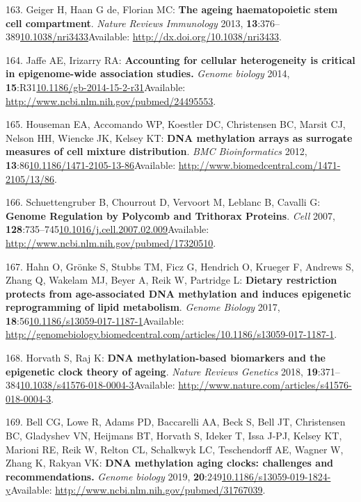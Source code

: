 \documentclass[
]{book}
\begin{document}
\leavevmode\hypertarget{ref-Geiger2013}{}%
163. Geiger H, Haan G de, Florian MC: \textbf{The ageing haematopoietic stem cell compartment}. \emph{Nature Reviews Immunology} 2013, \textbf{13}:376--389\href{https://doi.org/10.1038/nri3433}{10.1038/nri3433}Available: \url{http://dx.doi.org/10.1038/nri3433}.

\leavevmode\hypertarget{ref-Jaffe2014}{}%
164. Jaffe AE, Irizarry RA: \textbf{Accounting for cellular heterogeneity is critical in epigenome-wide association studies.} \emph{Genome biology} 2014, \textbf{15}:R31\href{https://doi.org/10.1186/gb-2014-15-2-r31}{10.1186/gb-2014-15-2-r31}Available: \url{http://www.ncbi.nlm.nih.gov/pubmed/24495553}.

\leavevmode\hypertarget{ref-Houseman2012}{}%
165. Houseman EA, Accomando WP, Koestler DC, Christensen BC, Marsit CJ, Nelson HH, Wiencke JK, Kelsey KT: \textbf{DNA methylation arrays as surrogate measures of cell mixture distribution}. \emph{BMC Bioinformatics} 2012, \textbf{13}:86\href{https://doi.org/10.1186/1471-2105-13-86}{10.1186/1471-2105-13-86}Available: \url{http://www.biomedcentral.com/1471-2105/13/86}.

\leavevmode\hypertarget{ref-Schuettengruber2017}{}%
166. Schuettengruber B, Chourrout D, Vervoort M, Leblanc B, Cavalli G: \textbf{Genome Regulation by Polycomb and Trithorax Proteins}. \emph{Cell} 2007, \textbf{128}:735--745\href{https://doi.org/10.1016/j.cell.2007.02.009}{10.1016/j.cell.2007.02.009}Available: \url{http://www.ncbi.nlm.nih.gov/pubmed/17320510}.

\leavevmode\hypertarget{ref-Hahn2017}{}%
167. Hahn O, Grönke S, Stubbs TM, Ficz G, Hendrich O, Krueger F, Andrews S, Zhang Q, Wakelam MJ, Beyer A, Reik W, Partridge L: \textbf{Dietary restriction protects from age-associated DNA methylation and induces epigenetic reprogramming of lipid metabolism}. \emph{Genome Biology} 2017, \textbf{18}:56\href{https://doi.org/10.1186/s13059-017-1187-1}{10.1186/s13059-017-1187-1}Available: \url{http://genomebiology.biomedcentral.com/articles/10.1186/s13059-017-1187-1}.

\leavevmode\hypertarget{ref-Horvath2018}{}%
168. Horvath S, Raj K: \textbf{DNA methylation-based biomarkers and the epigenetic clock theory of ageing}. \emph{Nature Reviews Genetics} 2018, \textbf{19}:371--384\href{https://doi.org/10.1038/s41576-018-0004-3}{10.1038/s41576-018-0004-3}Available: \url{http://www.nature.com/articles/s41576-018-0004-3}.

\leavevmode\hypertarget{ref-Bell2019}{}%
169. Bell CG, Lowe R, Adams PD, Baccarelli AA, Beck S, Bell JT, Christensen BC, Gladyshev VN, Heijmans BT, Horvath S, Ideker T, Issa J-PJ, Kelsey KT, Marioni RE, Reik W, Relton CL, Schalkwyk LC, Teschendorff AE, Wagner W, Zhang K, Rakyan VK: \textbf{DNA methylation aging clocks: challenges and recommendations.} \emph{Genome biology} 2019, \textbf{20}:249\href{https://doi.org/10.1186/s13059-019-1824-y}{10.1186/s13059-019-1824-y}Available: \url{http://www.ncbi.nlm.nih.gov/pubmed/31767039}.
\end{document}
